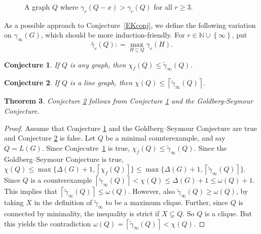 \documentclass[12pt]{article}
\theoremstyle{plain}
\newtheorem{thm}{Theorem}
\newtheorem{conj}[thm]{Conjecture}
\theoremstyle{definition}
\theoremstyle{remark}
\newcommand{\IN}{\mathbb{N}}
\newcommand{\set}[1]{\left\{ #1 \right\}}
\newcommand{\ceil}[1]{\left\lceil#1\right\rceil}
\newcommand{\DefinedAs}{\mathrel{\mathop:}=}
\begin{document}
\begin{figure}
\caption{A graph $Q$ where $\gamma_r(Q - x) > \gamma_r(Q)$ for all $r \ge 3$.}
\label{fig:NotMonotone}
\end{figure}


As a possible approach to Conjecture~\ref{EKconj}, we define the following
variation on $\gamma_{\infty}(G)$, which should be more induction-friendly.
For $r\in \IN \cup \set{\infty}$, put
\[\tilde{\gamma_r}(Q) \DefinedAs \max_{H \subseteq Q} \gamma_r(H).\]

\begin{conj}\label{KingEdwardsReplacement}
If $Q$ is any graph, then $\chi_f(Q) \le \tilde{\gamma}_\infty(Q)$.
\end{conj}

\begin{conj}\label{SuperDuperDuperLocalReed}
If $Q$ is a line graph, then $\chi(Q) \le \ceil{\tilde{\gamma}_\infty(Q)}$.
\end{conj}

\begin{thm}
Conjecture \ref{SuperDuperDuperLocalReed} follows from Conjecture \ref{KingEdwardsReplacement} and the Goldberg-Seymour Conjecture.
\end{thm}
\begin{proof}
Assume that Conjecture \ref{KingEdwardsReplacement} and the Goldberg--Seymour
Conjecture are true and Conjecture \ref{SuperDuperDuperLocalReed} is false. 
Let $Q$ be a minimal counterexample, and say $Q = L(G)$.   
Since Conjecutre~\ref{KingEdwardsReplacement} is true,
$\chi_f(Q)\le\tilde{\gamma}_\infty(Q)$.
Since the Goldberg--Seymour Conjecture is true,
$\chi(Q)\le\max\{\Delta(G)+1,\ceil{\chi_f(Q)}\} \le
\max\{\Delta(G)+1,\ceil{\tilde{\gamma}_\infty(Q)}\}$.
Since $Q$ is a counterexample
$\ceil{\tilde{\gamma}_\infty(Q)}
<\chi(Q)\le\Delta(G)+1\le \omega(Q)+1$.
This implies that 
$\ceil{\tilde{\gamma}_\infty(Q)}\le\omega(Q)$.  
However, also 
$\tilde{\gamma}_\infty(Q)\ge \omega(Q)$, by taking $X$ in the definition of 
$\tilde{\gamma}_\infty$ to be a maximum clique.  Further, since $Q$ is connected
by minimality, the inequality is strict if $X\subsetneq Q$.  So $Q$ is a clique.
But this yields the contradiction
$\omega(Q) = \ceil{\tilde{\gamma}_\infty(Q)} < \chi(Q)$.  
%
\end{proof}
\end{document}
